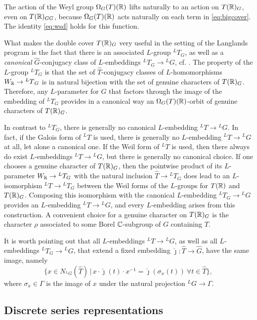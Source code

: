 \documentclass{article}
\theoremstyle{definition}
\numberwithin{equation}{section}
\renewcommand{\-}{\hyp{}}
\begin{document}
The action of the Weyl group $\Omega_G(T)(\mathbb{R})$ lifts naturally to an action on $T(\mathbb{R})_G$, even on $T(\mathbb{R})_{GG}$, because $\Omega_G(T)(\mathbb{R})$ acts naturally on each term in \eqref{eq:bigcover}. The identity \eqref{eq:wsd} holds for this function.

What makes the double cover $T(\mathbb{R})_G$ very useful in the setting of the Langlands program is the fact that there is an associated $L$\-group $^LT_G$, as well as a \emph{canonical} $\hat G$-conjugacy class of $L$\-embeddings $^LT_G \to {^LG}$, cf. \cite[\S4.1]{KalDC}. The property of the $L$\-group $^LT_G$ is that the set of $\hat T$-conjugacy classes of $L$\-homomorphisms $W_{\mathbb{R}} \to {^LT}_G$ is in natural bijection with the set of genuine characters of $T(\mathbb{R})_G$. Therefore, any $L$\-parameter for $G$ that factors through the image of the embedding of $^LT_G$ provides in a canonical way an $\Omega_G(T)(\mathbb{R})$-orbit of genuine characters of $T(\mathbb{R})_G$.

In contrast to $^LT_G$, there is generally no canonical $L$\-embedding $^LT \to {^LG}$. In fact, if the Galois form of $^LT$ is used, there is generally no $L$\-embedding $^LT \to {^LG}$ at all, let alone a canonical one. If the Weil form of $^LT$ is used, then there always do exist $L$\-embeddings $^LT \to {^LG}$, but there is generally no canonical choice. If one chooses a genuine character of $T(\mathbb{R})_G$, then the pointwise product of its $L$\-parameter $W_{\mathbb{R}} \to {^LT_G}$ with the natural inclusion $\hat T \to {^LT_G}$ does lead to an $L$\-isomorphism $^LT \to {^LT_G}$ between the Weil forms of the $L$\-groups for $T(\mathbb{R})$ and $T(\mathbb{R})_G$. Composing this isomorphism with the canonical $L$\-embedding $^LT_G \to {^LG}$ provides an $L$\-embedding $^LT \to {^LG}$, and every $L$\-embedding arises from this construction. A convenient choice for a genuine character on $T(\mathbb{R})_G$ is the character $\rho$ associated to some Borel $\mathbb{C}$-subgroup of $G$ containing $T$.

It is worth pointing out that all $L$\-embeddings $^LT \to {^LG}$, as well as all $L$\-embeddings $^LT_G \to {^LG}$, that extend a fixed embedding $\hat\jmath : \hat T \to \hat G$, have the same image, namely
\begin{equation} \label{eq:lembim}
\{x \in N_{^LG}(\hat T)\,|\, x\cdot\hat\jmath(t)\cdot x^{-1} = \hat\jmath(\sigma_x(t))\ \forall t \in \hat T\},
\end{equation}
where $\sigma_x \in \Gamma$ is the image of $x$ under the natural projection $^LG \to \Gamma$.


\subsection{Discrete series representations} \label{sub:essds}
\end{document}
